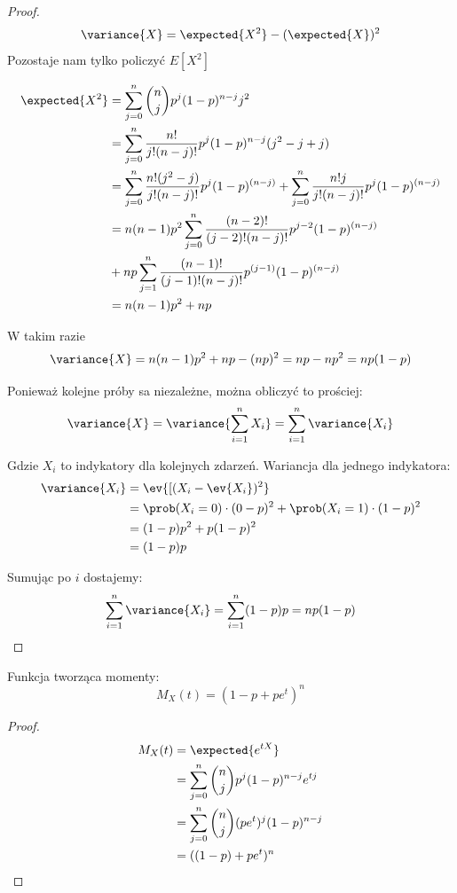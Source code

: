 \begin{proof}
	\[
		\variance{X} = \expected{X^2} - (\expected{X})^2
	\]
	Pozostaje nam tylko policzyć \( E[X^2]\)

	\begin{align*}
		\expected{X^2}
		 & = \sum_{j=0}^n\binom{n}{j}p^j(1-p)^{n-j}j^2                                                                \\
		 & = \sum_{j=0}^n\frac{n!}{j!(n-j)!}p^j(1-p)^{n-j}(j^2-j+j)                                                   \\
		 & = \sum_{j=0}^n\frac{n!(j^2-j)}{j!(n-j)!}p^j(1-p)^{(n-j)} +\sum_{j=0}^n\frac{n!j}{j!(n-j)!}p^j(1-p)^{(n-j)} \\
		 & = n(n-1)p^2 \sum_{j=0}^n\frac{(n-2)!}{(j-2)!(n-j)!}p^{j-2}(1-p)^{(n-j)}                                    \\
		 & +np\sum_{j=1}^n\frac{(n-1)!}{(j-1)!(n-j)!}p^{(j-1)}(1-p)^{(n-j)}                                           \\
		 & = n(n-1)p^2 + np
	\end{align*}

	W takim razie
	\[ \variance{X} = n(n-1)p^2 + np - (np)^2 = np - np^2 = np(1-p) \]

	Ponieważ kolejne próby sa niezależne, można obliczyć to prościej:
	\[
		\variance{X} = \variance{\sum_{i=1}^n X_i} = \sum_{i=1}^n \variance{X_i}
	\]

	Gdzie \(X_i\) to indykatory dla kolejnych zdarzeń.
	Wariancja dla jednego indykatora:
	\begin{align*}
		\variance{X_i}
		 & = \ev{[(X_i - \ev{X_i})^2}                                      \\
		 & = \prob(X_i = 0) \cdot (0 - p)^2 + \prob(X_i = 1) \cdot (1-p)^2 \\
		 & = (1-p)p^2 + p(1-p)^2                                           \\
		 & = (1-p)p
	\end{align*}

	Sumując po \(i\) dostajemy:
	\[
		\sum_{i=1}^n \variance{X_i} = \sum_{i=1}^n (1-p)p = np(1-p)
	\]
\end{proof}

\begin{theorem}
	Funkcja tworząca momenty:
	\[ M_X(t) = (1 - p + pe^t)^n\]
\end{theorem}

\begin{proof}
	\begin{align*}
		M_X(t) & = \expected{e^{tX}}                             \\
		       & = \sum_{j=0}^n \binom{n}{j}p^j(1-p)^{n-j}e^{tj} \\
		       & =  \sum_{j=0}^n \binom{n}{j}(pe^t)^j(1-p)^{n-j} \\
		       & = ((1-p) + pe^t)^n
	\end{align*}
\end{proof}

